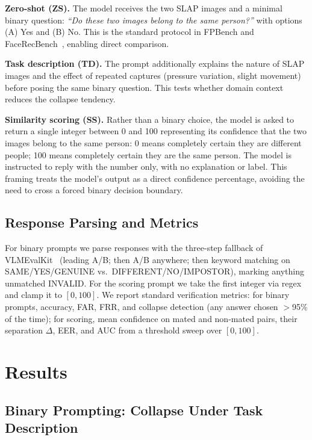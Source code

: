 \documentclass[runningheads]{llncs}
\begin{document}
\textbf{Zero-shot (ZS).}
The model receives the two SLAP images and a minimal binary question:
\textit{``Do these two images belong to the same person?''} with
options (A) Yes and (B) No.
This is the standard protocol in FPBench and
FaceRecBench~\cite{fpbench2025,facerecbench2025}, enabling direct
comparison.

\textbf{Task description (TD).}
The prompt additionally explains the nature of SLAP images and the
effect of repeated captures (pressure variation, slight movement)
before posing the same binary question.
This tests whether domain context reduces the collapse tendency.

\textbf{Similarity scoring (SS).}
Rather than a binary choice, the model is asked to return a single
integer between 0 and 100 representing its confidence that the two
images belong to the same person: 0 means completely certain they are
different people; 100 means completely certain they are the same person.
The model is instructed to reply with the number only, with no
explanation or label.
This framing treats the model's output as a direct confidence
percentage, avoiding the need to cross a forced binary decision boundary.

\subsection{Response Parsing and Metrics}

For binary prompts we parse responses with the three-step fallback of
VLMEvalKit~\cite{vlmevalkit} (leading A/B; then A/B anywhere; then keyword
matching on SAME/YES/GENUINE vs.\ DIFFERENT/NO/IMPOSTOR), marking anything
unmatched INVALID. For the scoring prompt we take the first integer via regex
and clamp it to $[0,100]$.
We report standard verification metrics: for binary prompts, accuracy, FAR,
FRR, and collapse detection (any answer chosen $>$95\% of the time); for
scoring, mean confidence on mated and non-mated pairs, their separation
$\Delta$, EER, and AUC from a threshold sweep over $[0,100]$.

\section{Results}
\label{sec:results}

\subsection{Binary Prompting: Collapse Under Task Description}
\end{document}
